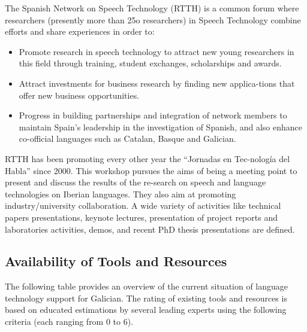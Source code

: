 \begin{multicols}{2}
\begin{itemize}
\begin{multicols}{2}
The Spanish Network on Speech Technology (RTTH) \cite{GAL-Nota34} is a common forum where researchers (presently more than 25o researchers) in Speech Technology combine efforts and share experiences in order to:
	\begin{itemize}
	\item Promote research in speech technology to attract new young researchers in this field through training, student exchanges, scholarships and awards.
	\item	 Attract investments for business research by finding new applica-tions that offer new business opportunities. 
	\item Progress in building partnerships and integration of network members to maintain Spain's leadership in the investigation of Spanish, and also enhance co-official languages such as Catalan, Basque and Galician.
    \end{itemize}
RTTH has been promoting every other year the “Jornadas en Tec-nología del Habla” since 2000. This workshop pursues the aims of being a meeting point to present and discuss the results of the re-search on speech and language technologies on Iberian languages. They also aim at promoting industry/university collaboration. A wide variety of activities like technical papers presentations, keynote lectures, presentation of project reports and laboratories activities, demos, and recent PhD thesis presentations are defined.
  
\subsection{Availability of Tools and Resources}

    The following table provides an overview of the current situation of language technology support for Galician. The rating of existing tools and resources is based on educated estimations by several leading experts using the following criteria (each ranging from 0 to 6). 


\end{multicols}
\end{itemize}
\end{multicols}
